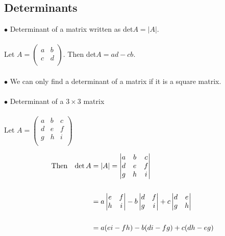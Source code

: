 \documentclass[11pt,a4paper]{article}
\begin{document}
\subsection{Determinants}
$\bullet$ Determinant of a matrix written as det$A=|A|$.\\\\
Let $A=
\begin{pmatrix}
a & b\\
c & d\\
\end{pmatrix}
$. Then det$A=ad-cb$.\\\\
$\bullet$ We can only find a determinant of a matrix if it is a square matrix.\\\\

$\bullet$ Determinant of a $3\times 3$ matrix\\\\
Let $A=
\begin{pmatrix}
a & b & c\\
d & e & f\\
g & h & i\\
\end{pmatrix}
$

\begin{align*}
\text{Then}\hspace{0.3cm} \det A &=
|A|=
\begin{vmatrix}
a & b & c\\
d & e & f\\
g & h & i\\
\end{vmatrix}\\\\
& = a
\begin{vmatrix}
e & f\\
h & i\\
\end{vmatrix}
- b
\begin{vmatrix}
d & f\\
g & i\\
\end{vmatrix}
+ c
\begin{vmatrix}
d & e\\
g & h\\
\end{vmatrix}\\\\
& = a(ei-fh)-b(di-fg)+c(dh-eg)\\
\end{align*}
\end{document}
